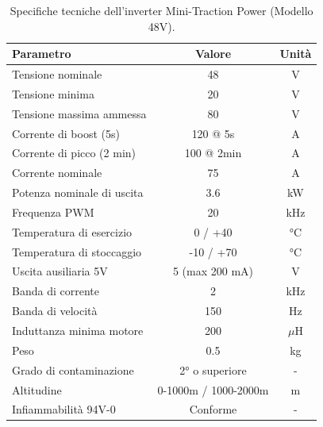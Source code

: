 \begin{table}[htbp]
    \centering
    \caption{Specifiche tecniche dell'inverter Mini-Traction Power (Modello 48V).}
    \label{tab:inverter_specs}
    \begin{tabular}{|l|c|c|}
        \hline
        \textbf{Parametro}         & \textbf{Valore}      & \textbf{Unità} \\
        \hline
        Tensione nominale          & 48                   & V              \\
        Tensione minima            & 20                   & V              \\
        Tensione massima ammessa   & 80                   & V              \\
        Corrente di boost (5s)     & 120 @ 5s             & A              \\
        Corrente di picco (2 min)  & 100 @ 2min           & A              \\
        Corrente nominale          & 75                   & A              \\
        Potenza nominale di uscita & 3.6                  & kW             \\
        Frequenza PWM              & 20                   & kHz            \\
        Temperatura di esercizio   & 0 / +40              & °C             \\
        Temperatura di stoccaggio  & -10 / +70            & °C             \\
        Uscita ausiliaria 5V       & 5 (max 200 mA)       & V              \\
        Banda di corrente          & 2                    & kHz            \\
        Banda di velocità          & 150                  & Hz             \\
        Induttanza minima motore   & 200                  & $\mu$H         \\
        Peso                       & 0.5                  & kg             \\
        Grado di contaminazione    & 2° o superiore       & -              \\
        Altitudine                 & 0-1000m / 1000-2000m & m              \\
        Infiammabilità 94V-0       & Conforme             & -              \\
        \hline
    \end{tabular}
\end{table}

